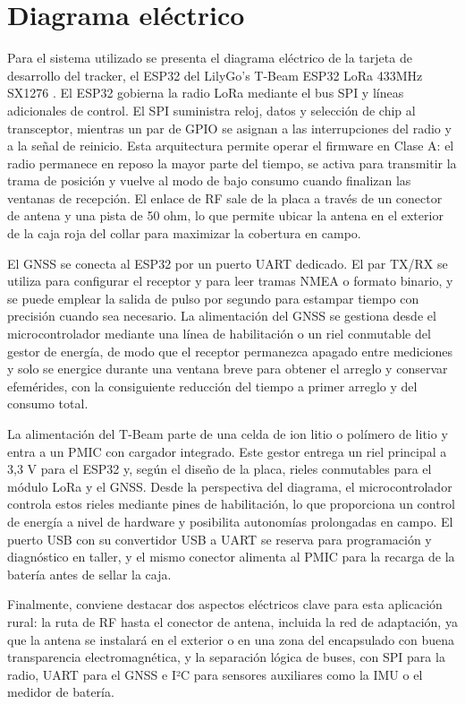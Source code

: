 \documentclass[journal]{IEEEtran}
\begin{document}
\section{Diagrama eléctrico}

Para el sistema utilizado se presenta el diagrama eléctrico de la tarjeta de desarrollo del tracker, el ESP32 del LilyGo's T-Beam ESP32 LoRa 433MHz SX1276 \cite{tbeam_v12_schematic}. El ESP32 gobierna la radio LoRa mediante el bus SPI y líneas adicionales de control. El SPI suministra reloj, datos y selección de chip al transceptor, mientras un par de GPIO se asignan a las interrupciones del radio y a la señal de reinicio. Esta arquitectura permite operar el firmware en Clase A: el radio permanece en reposo la mayor parte del tiempo, se activa para transmitir la trama de posición y vuelve al modo de bajo consumo cuando finalizan las ventanas de recepción. El enlace de RF sale de la placa a través de un conector de antena y una pista de 50 ohm, lo que permite ubicar la antena en el exterior de la caja roja del collar para maximizar la cobertura en campo.

El GNSS se conecta al ESP32 por un puerto UART dedicado. El par TX/RX se utiliza para configurar el receptor y para leer tramas NMEA o formato binario, y se puede emplear la salida de pulso por segundo para estampar tiempo con precisión cuando sea necesario. La alimentación del GNSS se gestiona desde el microcontrolador mediante una línea de habilitación o un riel conmutable del gestor de energía, de modo que el receptor permanezca apagado entre mediciones y solo se energice durante una ventana breve para obtener el arreglo y conservar efemérides, con la consiguiente reducción del tiempo a primer arreglo y del consumo total.

La alimentación del T-Beam parte de una celda de ion litio o polímero de litio y entra a un PMIC con cargador integrado. Este gestor entrega un riel principal a 3,3 V para el ESP32 y, según el diseño de la placa, rieles conmutables para el módulo LoRa y el GNSS. Desde la perspectiva del diagrama, el microcontrolador controla estos rieles mediante pines de habilitación, lo que proporciona un control de energía a nivel de hardware y posibilita autonomías prolongadas en campo. El puerto USB con su convertidor USB a UART se reserva para programación y diagnóstico en taller, y el mismo conector alimenta al PMIC para la recarga de la batería antes de sellar la caja.

Finalmente, conviene destacar dos aspectos eléctricos clave para esta aplicación rural: la ruta de RF hasta el conector de antena, incluida la red de adaptación, ya que la antena se instalará en el exterior o en una zona del encapsulado con buena transparencia electromagnética, y la separación lógica de buses, con SPI para la radio, UART para el GNSS e I²C para sensores auxiliares como la IMU o el medidor de batería. 
\end{document}

